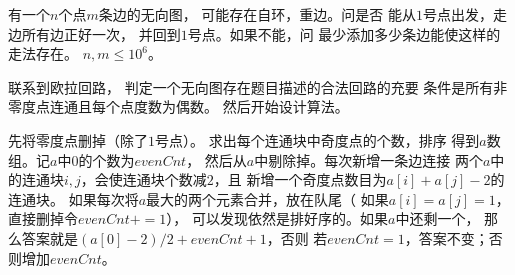 \begin{prob}
	有一个$n$个点$m$条边的无向图，
	可能存在自环，重边。问是否
	能从$1$号点出发，走边所有边正好一次，
	并回到$1$号点。如果不能，问
	最少添加多少条边能使这样的走法存在。
	$n,m \le 10^6$。
\end{prob}

\begin{sol}
	联系到欧拉回路，
	判定一个无向图存在题目描述的合法回路的充要
	条件是所有非零度点连通且每个点度数为偶数。
	然后开始设计算法。
	\par
	先将零度点删掉（除了$1$号点）。
	求出每个连通块中奇度点的个数，排序
	得到$a$数组。记$a$中$0$的个数为$evenCnt$，
	然后从$a$中剔除掉。每次新增一条边连接
	两个$a$中的连通块$i,j$，会使连通块个数减$2$，且
	新增一个奇度点数目为$a[i]+a[j]-2$的连通块。
	如果每次将$a$最大的两个元素合并，放在队尾（
	如果$a[i]=a[j]=1$，直接删掉令$evenCnt+=1$），
	可以发现依然是排好序的。如果$a$中还剩一个，
	那么答案就是$(a[0]-2)/2 + evenCnt+1$，否则
	若$evenCnt=1$，答案不变；否则增加$evenCnt$。
\end{sol}
